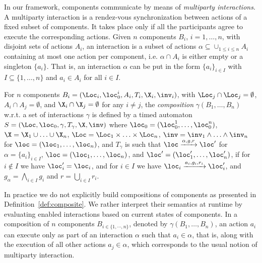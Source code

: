  In our framework, components communicate by means of
  \emph{multiparty interactions}.
  A multiparty interaction is a rendez-vous synchronization between actions of
  a fixed subset of components. It takes
  place only if all the participants agree to execute the corresponding actions.
  Given $n$ components $B_i$, $i=1,\dots,n$, with disjoint sets of actions
  $A_i$, an interaction is a subset of actions $\alpha \subseteq \cup_{1 \leq  i \leq n} A_i$
  containing at most one action per component, i.e. $\alpha \cap A_i$ is either empty or a singleton $\{ a_i \}$.
  That is, an interaction 
  $\alpha$ can be put in the form $\{ a_i \}_{i \in I}$ with $I \subseteq \{ 1, \ldots, n \}$ and $a_i \in A_i$ for all $i \in I$.
 
  
  

\begin{definition}[Composition] 
  \label{def:composite}
  For $n$ components $B_i = (\Loc_i,
  \loc^i_0, A_i, T_i, \X_i, \inv_i)$, with $\Loc_j \cap \Loc_j = \emptyset$, $A_i \cap A_j = 
  \emptyset$, and $\X_i \cap \X_j = \emptyset$ for any $i \neq j$, the
  \emph{composition} $\gamma(B_1, \ldots, B_n)$ w.r.t. a set of interactions
  $\gamma$ is defined by a timed automaton
  $S = (\Loc,\loc_0,\gamma,T_{\gamma},\X,\inv)$ where $\loc_0 =
  (\loc^1_0,\dots, \loc^n_0)$, $\X=\X_1\cup\ldots\cup\X_n$, $\Loc=\Loc_1\times\ldots\times\Loc_n$,
  $\inv=\inv_1 \wedge \ldots \wedge \inv_n$ for $\loc=(\loc_1,\dots,
  \loc_n)$, and $T_{\gamma}$ is such that $\loc\xrightarrow{\alpha,g,r}{}\loc'$ for 
  $\alpha=\{a_i\}_{i\in I}$, $\loc=(\loc_1,\dots,\loc_n)$, and $\loc'=(\loc'_1,\dots
  ,\loc'_n)$, if for $i\not\in I$ we have $\loc'_i = \loc_i$, and for $i\in I$ we have 
  $\loc_i\xrightarrow{a_i,g_i,r_i}\loc'_i$, and $g_{\alpha}=\bigwedge_{i\in I}g_i$ and $r=\bigcup_{i\in I}r_i$.
\end{definition}

In practice we do not explicitly build compositions of components as presented in Definition~\ref{def:composite}.
We rather interpret their semantics at runtime by evaluating enabled interactions based on current states of components.
In a composition of $n$ components $B_{i\in\{1,\cdots,n\}}$, denoted by $\gamma(B_1, \ldots, B_n)$,
an action $a_i$ can execute only as part of an interaction $\alpha$ such that $a_i \in
\alpha$, that is, along with the execution of all other actions $a_j
\in \alpha$, which corresponds to the usual notion of multiparty
interaction.

